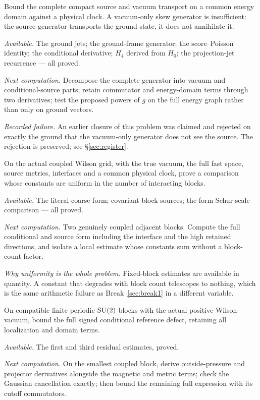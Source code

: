 \begin{problem}
\label{prob:r10}
Bound the complete compact source and vacuum transport on a common energy
domain against a physical clock. A vacuum-only skew generator is
insufficient: the source generator transports the ground state, it does
not annihilate it.

\emph{Available.} The ground jets; the ground-frame generator; the
score--Poisson identity; the conditional derivative; $H_4$ derived from
$H_0$; the projection-jet recurrence --- all proved.

\emph{Next computation.} Decompose the complete generator into vacuum and
conditional-source parts; retain commutator and energy-domain terms
through two derivatives; test the proposed powers of $g$ on the full
energy graph rather than only on ground vectors.

\emph{Recorded failure.} An earlier closure of this problem was claimed
and rejected on exactly the ground that the vacuum-only generator does
not see the source. The rejection is preserved; see \S\ref{sec:register}.
\end{problem}

\begin{problem}
\label{prob:grid}
On the actual coupled Wilson grid, with the true vacuum, the full fast
space, source metrics, interfaces and a common physical clock, prove a
comparison whose constants are uniform in the number of interacting
blocks.

\emph{Available.} The literal coarse form; covariant block sources; the
form Schur scale comparison --- all proved.

\emph{Next computation.} Two genuinely coupled adjacent blocks. Compute
the full conditional and source form including the interface and the high
retained directions, and isolate a local estimate whose constants sum
without a block-count factor.

\emph{Why uniformity is the whole problem.} Fixed-block estimates are
available in quantity. A constant that degrades with block count
telescopes to nothing, which is the same arithmetic failure as
Break~\ref{sec:break1} in a different variable.
\end{problem}

\begin{problem}
\label{prob:sc17}
On compatible finite periodic $\mathrm{SU}(2)$ blocks with the actual positive
Wilson vacuum, bound the full signed conditional reference defect,
retaining all localization and domain terms.

\emph{Available.} The first and third residual estimates, proved.

\emph{Next computation.} On the smallest coupled block, derive
outside-pressure and projector derivatives alongside the magnetic and
metric terms; check the Gaussian cancellation exactly; then bound the
remaining full expression with its cutoff commutators.
\end{problem}

